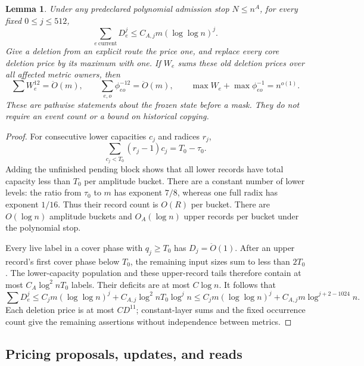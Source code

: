 \documentclass[11pt]{article}
\newtheorem{lemma}[theorem]{Lemma}
\theoremstyle{remark}
\renewcommand{\O}{\ddot{O}}
\begin{document}
\begin{lemma}
\label{lem:ram27-current-moments}
Under any predeclared polynomial admission stop $N\le n^A$, for every fixed
$0\le j\le512$,
\[
 \sum_{e\ \mathrm{current}}D_e^j\le C_{A,j}m(\log\log n)^j.
\]
Give a deletion from an explicit route the price one, and replace every core
deletion price by its maximum with one.
If $W_e$ sums these old deletion prices over all affected metric owners, then
\[
 \sum W_e^{12}=\O(m),\qquad
 \sum_{e,o}\phi_{eo}^{-12}=\O(m),\qquad
 \max W_e+\max\phi_{eo}^{-1}=n^{o(1)}.
\]
These are pathwise statements about the frozen state before a mask.
They do not require an event count or a bound on historical copying.
\end{lemma} \begin{proof} For consecutive lower capacities $c_j$ and radices
$r_j$,
\[
 \sum_{c_j<T_0}(r_j-1)c_j=T_0-\tau_0.
\]
Adding the unfinished pending block shows that all lower records have total
capacity less than $T_0$ per amplitude bucket.
There are a constant number of lower levels: the ratio from $\tau_0$ to $m$ has
exponent $7/8$, whereas one full radix has exponent $1/16$.
Thus their record count is $O(R)$ per bucket.
There are $O(\log n)$ amplitude buckets and $O_A(\log n)$ upper records per bucket under
the polynomial stop.

Every live label in a cover phase with $q_j\ge T_0$ has $D_j=\O(1)$.
After an upper record's first cover phase below $T_0$, the remaining input sizes
sum to less than $2T_0$.
The lower-capacity population and these upper-record tails therefore contain at
most $C_A \log^2 nT_0$ labels.
Their deficits are at most $C\log n$.
It follows that
\[
 \sum D_e^j\le C_jm(\log\log n)^j+C_{A,j}\log^2 nT_0\log^j n
 \le C_jm(\log\log n)^j+C_{A,j}m\log^{j+2-1024} n.
\]
Each deletion price is at most $CD^{11}$; constant-layer sums and the fixed
occurrence count give the remaining assertions without independence between
metrics.
\end{proof}

\subsection{Pricing proposals, updates, and reads}
\end{document}
